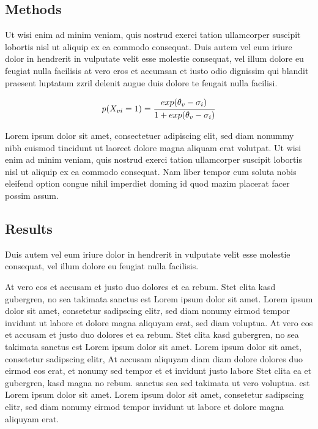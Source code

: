 \documentclass{article}
\begin{document}
\vfil

\begin{posterbox}

\vspace{-10mm}

\section*{Methods}

\raggedright

Ut wisi enim ad minim veniam, quis nostrud exerci tation ullamcorper suscipit lobortis nisl ut aliquip ex ea commodo consequat. Duis autem vel eum iriure dolor in hendrerit in vulputate velit esse molestie consequat, vel illum dolore eu feugiat nulla facilisis at vero eros et accumsan et iusto odio dignissim qui blandit praesent luptatum zzril delenit augue duis dolore te feugait nulla facilisi.

$$
 p\!\left(X_{vi} = 1\right) = \frac{exp\!\left(\theta_v - \sigma_i\right)\strut}
 {\strut 1 + exp\!\left(
 \theta_v - \sigma_i\right)}
$$


Lorem ipsum dolor sit amet, consectetuer adipiscing elit, sed diam nonummy nibh euismod tincidunt ut laoreet dolore magna aliquam erat volutpat. Ut wisi enim ad minim veniam, quis nostrud exerci tation ullamcorper suscipit lobortis nisl ut aliquip ex ea commodo consequat.
Nam liber tempor cum soluta nobis eleifend option congue nihil imperdiet doming id quod mazim placerat facer possim assum.


\end{posterbox}

\vfil

\begin{posterbox}

\vspace{-10mm}

\section*{Results}

\raggedright

Duis autem vel eum iriure dolor in hendrerit in vulputate velit esse molestie consequat, vel illum dolore eu feugiat nulla facilisis.


At vero eos et accusam et justo duo dolores et ea rebum. Stet clita kasd gubergren, no sea takimata sanctus est Lorem ipsum dolor sit amet. Lorem ipsum dolor sit amet, consetetur sadipscing elitr, sed diam nonumy eirmod tempor invidunt ut labore et dolore magna aliquyam erat, sed diam voluptua. At vero eos et accusam et justo duo dolores et ea rebum. Stet clita kasd gubergren, no sea takimata sanctus est Lorem ipsum dolor sit amet. Lorem ipsum dolor sit amet, consetetur sadipscing elitr, At accusam aliquyam diam diam dolore dolores duo eirmod eos erat, et nonumy sed tempor et et invidunt justo labore Stet clita ea et gubergren, kasd magna no rebum. sanctus sea sed takimata ut vero voluptua. est Lorem ipsum dolor sit amet. Lorem ipsum dolor sit amet, consetetur sadipscing elitr, sed diam nonumy eirmod tempor invidunt ut labore et dolore magna aliquyam erat.

\end{posterbox}
\end{document}
